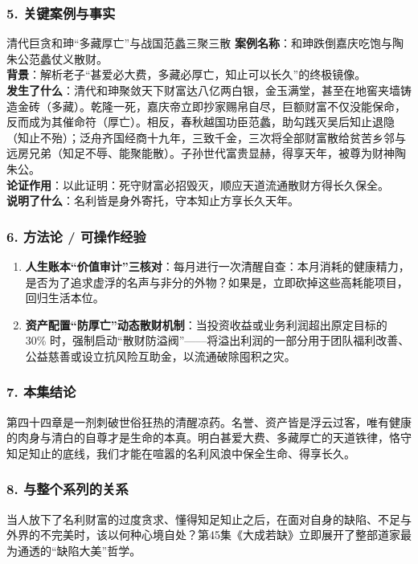 \subsubsection{5. 关键案例与事实}
\begin{CaseBox}{清代巨贪和珅“多藏厚亡”与战国范蠡三聚三散}
\textbf{案例名称}：和珅跌倒嘉庆吃饱与陶朱公范蠡仗义散财。\\
\textbf{背景}：解析老子“甚爱必大费，多藏必厚亡，知止可以长久”的终极镜像。\\
\textbf{发生了什么}：清代和珅聚敛天下财富达八亿两白银，金玉满堂，甚至在地窖夹墙铸造金砖（多藏）。乾隆一死，嘉庆帝立即抄家赐帛自尽，巨额财富不仅没能保命，反而成为其催命符（厚亡）。相反，春秋越国功臣范蠡，助勾践灭吴后知止退隐（知止不殆）；泛舟齐国经商十九年，三致千金，三次将全部财富散给贫苦乡邻与远房兄弟（知足不辱、能聚能散）。子孙世代富贵显赫，得享天年，被尊为财神陶朱公。\\
\textbf{论证作用}：以此证明：死守财富必招毁灭，顺应天道流通散财方得长久保全。\\
\textbf{说明了什么}：名利皆是身外寄托，守本知止方享长久天年。
\end{CaseBox}

\subsubsection{6. 方法论 / 可操作经验}
\begin{enumerate}
    \item \textbf{人生账本“价值审计”三核对}：每月进行一次清醒自查：本月消耗的健康精力，是否为了追求虚浮的名声与非分的外物？如果是，立即砍掉这些高耗能项目，回归生活本位。
    \item \textbf{资产配置“防厚亡”动态散财机制}：当投资收益或业务利润超出原定目标的 30\% 时，强制启动“散财防溢阀”——将溢出利润的一部分用于团队福利改善、公益慈善或设立抗风险互助金，以流通破除囤积之灾。
\end{enumerate}

\subsubsection{7. 本集结论}
第四十四章是一剂刺破世俗狂热的清醒凉药。名誉、资产皆是浮云过客，唯有健康的肉身与清白的自尊才是生命的本真。明白甚爱大费、多藏厚亡的天道铁律，恪守知足知止的底线，我们才能在喧嚣的名利风浪中保全生命、得享长久。

\subsubsection{8. 与整个系列的关系}
当人放下了名利财富的过度贪求、懂得知足知止之后，在面对自身的缺陷、不足与外界的不完美时，该以何种心境自处？第45集《大成若缺》立即展开了整部道家最为通透的“缺陷大美”哲学。

